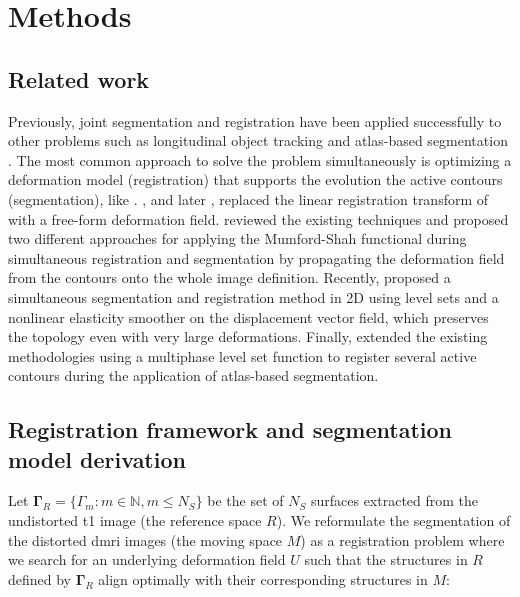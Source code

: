 \documentclass[3p,authoryear,fleqn]{elsarticle}
\providecommand{\gammaset}{\ensuremath{\boldsymbol{\Gamma}}}
\begin{document}
\makeatletter{}\section{Methods}
\label{sec:methods}
\subsection{Related work}\label{sec:related_work}
Previously, joint segmentation and registration have been applied successfully to other problems
such as longitudinal object tracking \citep{paragios_level_2003} and atlas-based
  segmentation \citep{gorthi_active_2011}.
The most common approach to solve the problem simultaneously is optimizing a deformation model
  (registration) that supports the evolution the active contours (segmentation), like
  \citep{paragios_level_2003,yezzi_variational_2003}.
\cite{unal_coupled_2005}, and later \cite{wang_joint_2006}, replaced the linear registration
  transform of \citep{yezzi_variational_2003} with a free-form deformation field.
\cite{droske_mumfordshah_2009} reviewed the existing techniques and proposed two different
  approaches for applying the Mumford-Shah functional \citep{mumford_optimal_1989} during simultaneous
  registration and segmentation by propagating the deformation field from
  the contours onto the whole image definition.
Recently, \cite{guyader_combined_2011} proposed a simultaneous segmentation and
  registration method in 2D using level sets and a nonlinear elasticity smoother on the
  displacement vector field, which preserves the topology even with very large deformations.
Finally, \cite{gorthi_active_2011} extended the existing methodologies using a multiphase
  level set function to register several active contours during the application
  of atlas-based segmentation.


\subsection{Registration framework and segmentation model derivation}\label{sec:methods_map}
Let $\gammaset_R = \{\Gamma_m: m \in \mathbb{N}, m \leq N_S\}$ be the set of $N_S$ surfaces
  extracted from the undistorted \gls*{t1} image (the reference space $R$).
We reformulate the segmentation of the distorted \gls*{dmri} images (the moving space $M$)
  as a registration problem where we search for an underlying deformation field $U$ such that
  the structures in $R$ defined by $\gammaset_R$ align optimally with their corresponding
  structures in $M$:
\end{document}
